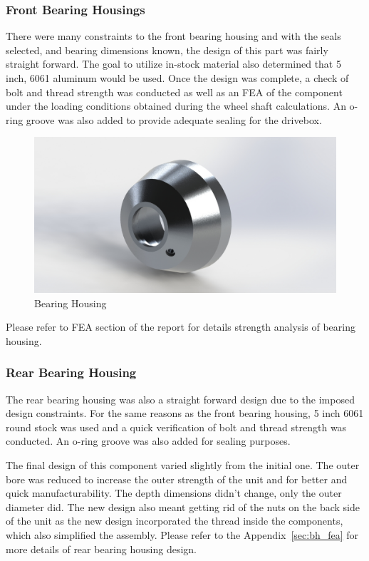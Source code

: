 \subsubsection{Front Bearing Housings}
There were many constraints to the front bearing housing and with the seals selected, and bearing dimensions known, the design of this part was fairly straight forward. The goal to utilize in-stock material also determined that 5 inch, 6061 aluminum would be used. Once the design was complete, a check of bolt and thread strength was conducted as well as an FEA of the component under the loading conditions obtained during the wheel shaft calculations. An o-ring groove was also added to provide adequate sealing for the drivebox.

\begin{figure}[h]\centering
	\includegraphics[width=.7\linewidth]{dom/hub_iso_rndr.jpg}
	\caption{Bearing Housing}
	\label{fig:housing}
\end{figure}

Please refer to FEA section of the report for details strength analysis of bearing housing.

\subsubsection{Rear Bearing Housing}
The rear bearing housing was also a straight forward design due to the imposed design constraints. For the same reasons as the front bearing housing, 5 inch 6061 round stock was used and a quick verification of bolt and thread strength was conducted. An o-ring groove was also added for sealing purposes.

The final design of this component varied slightly from the initial one. The outer bore was reduced to increase the outer strength of the unit and for better and quick manufacturability. The depth dimensions didn't change, only the outer diameter did. The new design also meant getting rid of the nuts on the back side of the unit as the new design incorporated the thread inside the components, which also simplified the assembly. Please refer to the Appendix~\ref{sec:bh_fea} for more details of rear bearing housing design.

